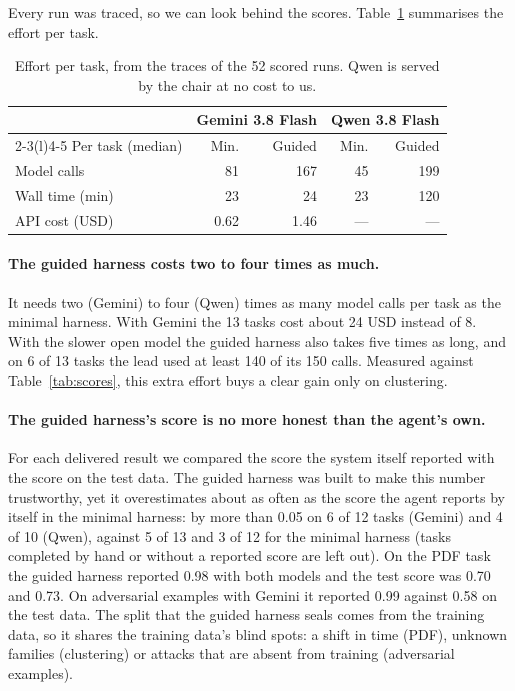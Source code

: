 \documentclass[letterpaper,twocolumn,10pt]{article}
\begin{document}
Every run was traced, so we can look behind the scores.
Table~\ref{tab:effort} summarises the effort per task.

\begin{table}[t]
\centering
\footnotesize
\setlength{\tabcolsep}{4pt}
\begin{tabular}{@{}lrrrr@{}}
\toprule
 & \multicolumn{2}{c}{Gemini 3.8 Flash} & \multicolumn{2}{c}{Qwen 3.8 Flash} \\
\cmidrule(lr){2-3}\cmidrule(l){4-5}
Per task (median) & Min. & Guided & Min. & Guided \\
\midrule
Model calls       & 81   & 167  & 45   & 199 \\
Wall time (min)   & 23   & 24   & 23   & 120 \\
API cost (USD)    & 0.62 & 1.46 & ---  & --- \\
\bottomrule
\end{tabular}
\caption{Effort per task, from the traces of the 52 scored runs. Qwen is
served by the chair at no cost to us.}
\label{tab:effort}
\end{table}

\paragraph{The guided harness costs two to four times as much.} It
needs two (Gemini) to four (Qwen) times as many model calls per
task as the minimal harness. With Gemini the 13 tasks cost about 24 USD
instead of 8. With the slower open model the guided harness also takes five times
as long, and on 6 of 13 tasks the lead used at least 140 of its 150 calls. Measured against Table~\ref{tab:scores}, this
extra effort buys a clear gain only on clustering.

\paragraph{The guided harness's score is no more honest than the agent's
own.} For each delivered result we compared the score the system itself
reported with the score on the test data. The guided harness was built to
make this number trustworthy, yet it overestimates about as often as the
score the agent reports by itself in the minimal harness: by more than 0.05 on 6 of 12 tasks (Gemini) and 4 of
10 (Qwen), against 5 of 13 and 3 of 12 for the minimal harness (tasks
completed by hand or without a reported score are left out). On the PDF
task the guided harness reported 0.98 with both models and the test score was
0.70 and 0.73. On adversarial examples with Gemini it reported 0.99 against
0.58 on the test data. The split that the guided harness seals comes from the
training data, so it shares the training data's blind spots: a shift in
time (PDF), unknown families (clustering) or attacks that are absent from
training (adversarial examples).
\end{document}
